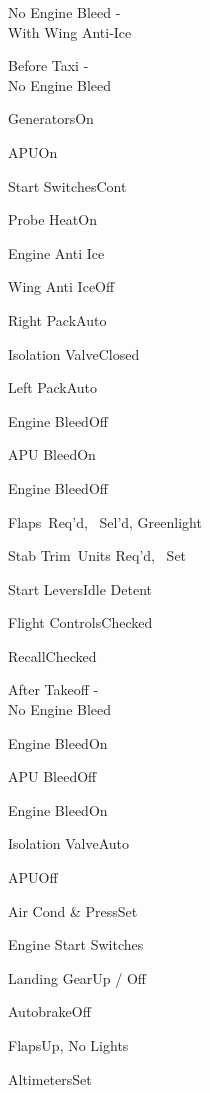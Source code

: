 \documentclass[sim-use, blue_items, halfpage]{checklist}
\begin{document}
\begin{checklist}{No Engine Bleed -\\With Wing Anti-Ice}
\end{checklist}

\begin{checklist}{Before Taxi -\\No Engine Bleed}
  \item{Generators}{On}
  \item{APU}{On}
  \item{Start Switches}{Cont}
  \item{Probe Heat}{On}
  \item{Engine Anti Ice}{\blank}
  \item{Wing Anti Ice}{Off}
  \item{Right Pack}{Auto}
  \item{Isolation Valve}{Closed}
  \item{Left Pack}{Auto}
  \item{Engine  Bleed}{Off}
  \item{APU Bleed}{On}
  \item{Engine  Bleed}{Off}
  \item{Flaps}{\blank\ Req'd, \blank\ Sel'd, Greenlight}
  \item{Stab Trim}{\blank\ Units Req'd, \blank\ Set}
  \item{Start Levers}{Idle Detent}
  \item{Flight Controls}{Checked}
  \item{Recall}{Checked}
\end{checklist}

\begin{checklist}{After Takeoff -\\No Engine Bleed}
  \item{Engine  Bleed}{On}
  \item{APU Bleed}{Off}
  \item{Engine  Bleed}{On}
  \item{Isolation Valve}{Auto}
  \item{APU}{Off}
  \item{Air Cond \& Press}{Set}
  \item{Engine Start Switches}{\blank}
  \item{Landing Gear}{Up / Off}
  \item{Autobrake}{Off}
  \item{Flaps}{Up, No Lights}
  \item{Altimeters}{Set}
\end{checklist}
\end{document}
